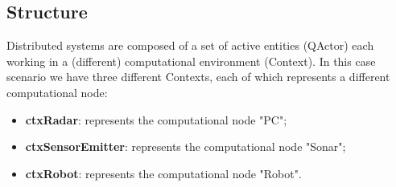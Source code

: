 \subsection{Structure}
Distributed systems are composed of a set of active entities (QActor) each working in a (different) computational environment (Context). In this case scenario we have three different Contexts, each of which represents a different computational node:
\begin{itemize}
	\item \textbf{ctxRadar}: represents the computational node "PC";
	\item \textbf{ctxSensorEmitter}: represents the computational node "Sonar";
	\item \textbf{ctxRobot}: represents the computational node "Robot".
\end{itemize}